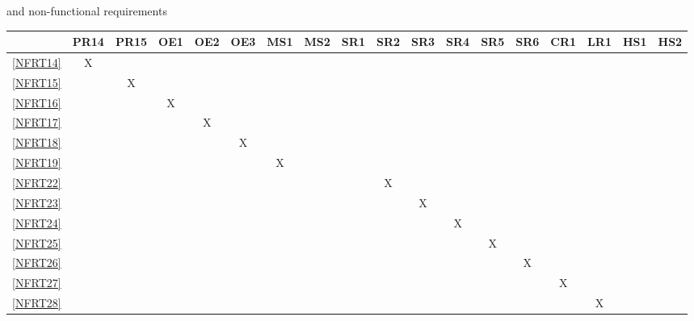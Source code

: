 \documentclass[12pt, titlepage]{article}
\begin{document}
\begin{landscape}
\begin{table}[h!]
{      and non-functional requirements}
    \label{tab:nfrt1}
  \end{table}
  \begin{table}[h!]
    \centering
    \begin{tabular}{|c|c|c|c|c|c|c|c|c|c|c|c|c|c|c|c|c|c|} \hline
                & PR14 & PR15 & OE1 & OE2 & OE3 & MS1 & MS2 & SR1 & SR2 & SR3 & SR4 & SR5 & SR6 & CR1 & LR1 & HS1 & HS2 \\ \hline
      \ref{NFRT14} & X    &      &     &     &     &     &     &     &     &     &     &     &     &     &     &     &     \\ \hline
      \ref{NFRT15} &      & X    &     &     &     &     &     &     &     &     &     &     &     &     &     &     &     \\ \hline
      \ref{NFRT16} &      &      & X   &     &     &     &     &     &     &     &     &     &     &     &     &     &     \\ \hline
      \ref{NFRT17} &      &      &     & X   &     &     &     &     &     &     &     &     &     &     &     &     &     \\ \hline
      \ref{NFRT18} &      &      &     &     & X   &     &     &     &     &     &     &     &     &     &     &     &     \\ \hline
      \ref{NFRT19} &      &      &     &     &     & X   &     &     &     &     &     &     &     &     &     &     &     \\ \hline
      \ref{NFRT22} &      &      &     &     &     &     &     &     & X   &     &     &     &     &     &     &     &     \\ \hline
      \ref{NFRT23} &      &      &     &     &     &     &     &     &     & X   &     &     &     &     &     &     &     \\ \hline
      \ref{NFRT24} &      &      &     &     &     &     &     &     &     &     & X   &     &     &     &     &     &     \\ \hline
      \ref{NFRT25} &      &      &     &     &     &     &     &     &     &     &     & X   &     &     &     &     &     \\ \hline
      \ref{NFRT26} &      &      &     &     &     &     &     &     &     &     &     &     & X   &     &     &     &     \\ \hline
      \ref{NFRT27} &      &      &     &     &     &     &     &     &     &     &     &     &     & X   &     &     &     \\ \hline
      \ref{NFRT28} &      &      &     &     &     &     &     &     &     &     &     &     &     &     & X   &     &     \\ \hline

\end{tabular}
\end{table}
\end{landscape}
\end{document}
